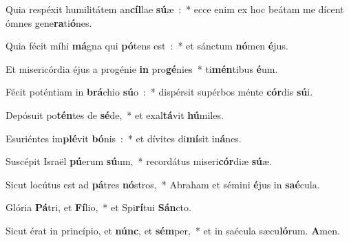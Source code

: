 \item Quia respéxit humilitátem an\textbf{cíl}lae \textbf{sú}æ~:~* ecce enim ex hoc beátam me dícent ómnes gene\textbf{ra}ti\textbf{ó}nes.
\item Quia fécit míhi \textbf{má}gna qui \textbf{pó}tens est~:~* et sánctum \textbf{nó}men \textbf{é}jus.
\item Et misericórdia éjus a progénie \textbf{in} pro\textbf{gé}nies~* ti\textbf{mén}tibus \textbf{é}um.
\item Fécit poténtiam in \textbf{brá}chio \textbf{sú}o~:~* dispérsit supérbos ménte \textbf{cór}dis \textbf{sú}i.
\item Depósuit po\textbf{tén}tes de \textbf{sé}de,~* et exal\textbf{tá}vit \textbf{hú}miles.
\item Esuriéntes im\textbf{plé}vit \textbf{bó}nis~:~* et dívites di\textbf{mí}sit in\textbf{á}nes.
\item Suscépit Israël \textbf{pú}erum \textbf{sú}um,~* recordátus miseri\textbf{cór}diæ \textbf{sú}æ.
\item Sicut locútus est ad \textbf{pá}tres \textbf{nó}stros,~* Abraham et sémini \textbf{é}jus in \textbf{saé}cula.
\item Glória \textbf{Pá}tri, et \textbf{Fí}lio,~* et Spi\textbf{rí}tui \textbf{Sán}cto.
\item Sicut érat in princípio, et \textbf{núnc}, et \textbf{sém}per,~* et in saécula sæcu\textbf{ló}rum. \textbf{A}men.
